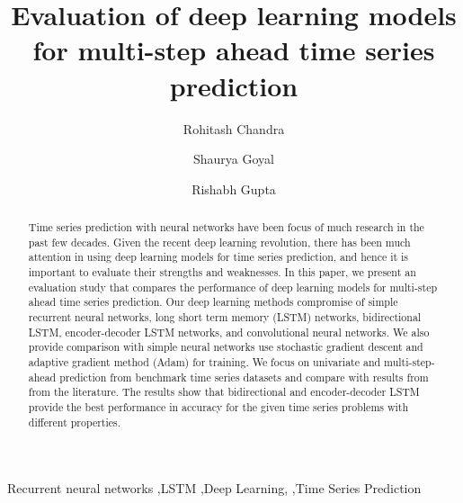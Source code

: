 \documentclass[final,5p,times,twocolumn]{elsarticle}
\begin{document}
\begin{frontmatter}



\title{ Evaluation of deep  learning models for multi-step ahead time series prediction}







\author[ctds,geo]{Rohitash Chandra}

\author[iitd]{Shaurya Goyal} 


\author[iitk]{Rishabh Gupta} 




\address[ctds]{School of Mathematics and Statistics, UNSW  Sydney, 
NSW 2006, Australia} 

\address[iitd]{Department of Mathematics, Indian Institute of Technology, Delhi, 110016 , India}
 
\address[iitk]{Department of Geology and Geophysics, Indian Institute of Technology,Kharagpur, 721302 , India}

\begin{abstract}
Time series prediction with neural networks have been focus of much research in the past few decades. Given the recent deep learning revolution, there has been much attention in using deep learning models for time series prediction, and hence it is important to evaluate their strengths and weaknesses.  In this paper, we present an evaluation study that compares the performance  of  deep learning models  for multi-step ahead time series prediction.  Our deep learning methods compromise of simple recurrent neural networks,   long short term memory  (LSTM) networks, bidirectional  LSTM,  encoder-decoder LSTM networks, and convolutional neural networks. We also provide comparison with  simple neural networks use stochastic gradient descent and  adaptive gradient method (Adam) for training. We focus on  univariate   and multi-step-ahead prediction from benchmark time series datasets and compare with results from from the literature. The results show that bidirectional and encoder-decoder LSTM provide the best performance in accuracy for the given  time series problems with different properties. 
  
  

\end{abstract}

\begin{keyword}
 Recurrent neural networks \sep LSTM \sep Deep Learning, \sep Time Series Prediction

\end{keyword}

\end{frontmatter}
\end{document}
